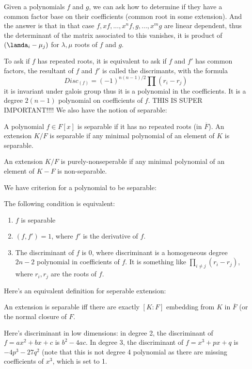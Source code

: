 \documentclass[main.tex]{subfiles}
\begin{document}
Given a polynomials $f$ and $g$, we can ask how to determine if they have a common factor base on their coefficients (common root in some extension). And the answer is that in that case $f, xf, ..., x^n f, g, ..., x^m g$ are linear dependent, thus the determinant of the matrix associated to this vanishes, it is product of $(\lamda_i - \mu_j)$ for $\lambda, \mu$ roots of $f$ and $g$.

To ask if $f$ has repeated roots, it is equivalent to ask if $f$ and $f'$ has common factors, the resultant of $f$ and $f'$ is called the discrimants, with the formula 
$$
Disc_(f) = (-1)^{n(n-1)/2}\prod(r_i - r_j)
$$
it is invariant under galois group thus it is a polynomial in the coefficients. It is a degree $2(n-1)$ polynomial on coefficients of $f$. THIS IS SUPER IMPORTANT!!!!
We also have the notion of separable:

\begin{definition}
A polynomial $f \in F[x]$ is separable if it has no repeated roots (in $\overline{F}$).
An extension $K/F$ is separable if any minimal polynomial of an element of $K$ is separable. 

An extension $K/F$ is purely-nonseperable if any minimal polynomial of an element of $K - F$ is non-separable.
\end{definition}

We have criterion for a polynomial to be separable:
\begin{lemma}
The following condition is equivalent:
\begin{enumerate}
    \item $f$ is separable
    \item $(f, f') = 1$, where $f'$ is the derivative of $f$.
    \item The discriminant of $f$ is 0, where discriminant is a homogeneous degree $2n-2$ polynomial in coefficients of $f$. It is something like $\prod_{i \neq j} (r_i - r_j)$, where $r_i, r_j$ are the roots of $f$.
\end{enumerate}
\end{lemma}

Here's an equivalent definition for seperable extension:

\begin{lemma}
An extension is separable iff there are exactly $[K:F]$ embedding from $K$ in $\overline{F}$ (or the normal closure of $F$.
\end{lemma}

Here's discriminant in low dimensions: in degree 2, the discriminant of $f = ax^2 + bx + c$ is $b^2 - 4ac$. In degree 3, the discriminant of $f = x^3 + px + q$ is $-4 p^3 - 27 q^2$ (note that this is not degree 4 polynomial as there are missing coefficients of $x^3$, which is set to 1.
\end{document}
